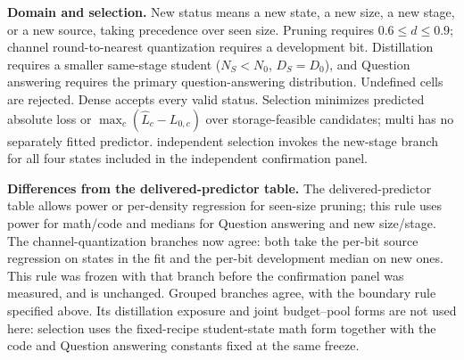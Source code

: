\par\noindent\textbf{Domain and selection.} New status means a new state, a new size, a new stage, or a new source, taking precedence over seen size. Pruning requires $0.6\le d\le0.9$; channel round-to-nearest quantization requires a development bit. Distillation requires a smaller same-stage student ($N_S<N_0$, $D_S=D_0$), and Question answering requires the primary question-answering distribution. Undefined cells are rejected. Dense accepts every valid status. Selection minimizes predicted absolute loss or $\max_c(\widehat L_c-L_{0,c})$ over storage-feasible candidates; multi has no separately fitted predictor. independent selection invokes the new-stage branch for all four states included in the independent confirmation panel.
\par\noindent\textbf{Differences from the delivered-predictor table.} The delivered-predictor table allows power or per-density regression for seen-size pruning; this rule uses power for math/code and medians for Question answering and new size/stage. The channel-quantization branches now agree: both take the per-bit source regression on states in the fit and the per-bit development median on new ones. This rule was frozen with that branch before the confirmation panel was measured, and is unchanged. Grouped branches agree, with the boundary rule specified above. Its distillation exposure and joint budget--pool forms are not used here: selection uses the fixed-recipe student-state math form together with the code and Question answering constants fixed at the same freeze.
\endgroup
